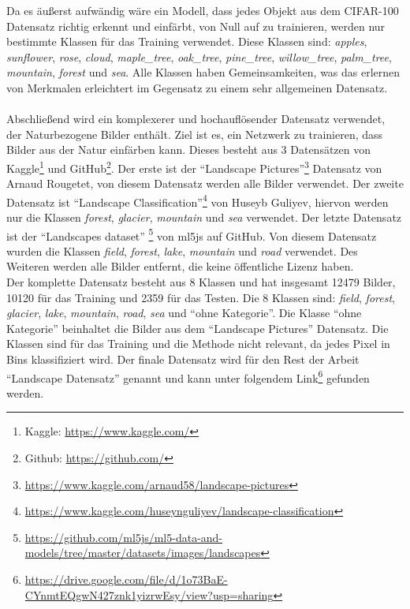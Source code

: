 Da es äußerst aufwändig wäre ein Modell, dass jedes Objekt aus dem CIFAR-100 Datensatz richtig erkennt und einfärbt,
von Null auf zu trainieren, werden
nur bestimmte Klassen für das Training verwendet. Diese Klassen sind: \textit{apples}, \textit{sunflower}, \textit{rose}, \textit{cloud},
\textit{maple\_tree}, \textit{oak\_tree}, \textit{pine\_tree}, \textit{willow\_tree}, \textit{palm\_tree},
\textit{mountain}, \textit{forest} und \textit{sea}.
Alle Klassen haben Gemeinsamkeiten, was das erlernen von Merkmalen erleichtert im Gegensatz zu einem sehr allgemeinen Datensatz.
\\
\\
Abschließend wird ein komplexerer und hochauflösender Datensatz verwendet, der Naturbezogene Bilder enthält. Ziel ist es, ein Netzwerk zu
trainieren, dass Bilder aus der Natur einfärben kann. Dieses besteht aus 3 Datensätzen von
Kaggle\footnote{Kaggle: \url{https://www.kaggle.com/}} und GitHub\footnote{Github: \url{https://github.com/}}.
Der erste ist der ``Landscape Pictures''\footnote{\url{https://www.kaggle.com/arnaud58/landscape-pictures}} Datensatz von Arnaud Rougetet, von diesem
Datensatz werden alle Bilder verwendet. Der zweite Datensatz ist
``Landscape Classification''\footnote{\url{https://www.kaggle.com/huseynguliyev/landscape-classification}} von Huseyb Guliyev, hiervon werden nur
die Klassen \textit{forest}, \textit{glacier}, \textit{mountain} und \textit{sea} verwendet. Der letzte Datensatz ist der ``Landscapes dataset''
\footnote{\url{https://github.com/ml5js/ml5-data-and-models/tree/master/datasets/images/landscapes}} von ml5js auf GitHub. Von diesem Datensatz wurden
die Klassen \textit{field}, \textit{forest}, \textit{lake}, \textit{mountain} und \textit{road} verwendet. Des Weiteren werden alle Bilder entfernt,
die keine öffentliche Lizenz haben.
\\
Der komplette Datensatz besteht aus 8 Klassen und hat insgesamt
12479 Bilder, 10120 für das Training und 2359 für das Testen. Die 8 Klassen sind: \textit{field}, \textit{forest}, \textit{glacier},
\textit{lake}, \textit{mountain}, \textit{road}, \textit{sea} und ``ohne Kategorie''.
Die Klasse ``ohne Kategorie'' beinhaltet die Bilder aus dem ``Landscape Pictures'' Datensatz. Die Klassen sind für das Training und
die Methode nicht relevant, da jedes Pixel in Bins klassifiziert wird. Der finale Datensatz wird für den Rest der
Arbeit ``Landscape Datensatz'' genannt und kann unter folgendem Link\footnote{\url{https://drive.google.com/file/d/1o73BaE-CYnmtEQgwN427znk1yizrwEsy/view?usp=sharing}} gefunden werden.

